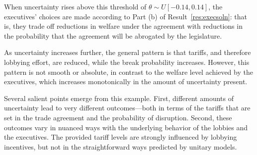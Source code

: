 \documentclass[10pt]{article}
\newcommand{\ve}{\theta}
\begin{document}

When uncertainty rises above this threshold of $\ve \sim U[-0.14,0.14]$, the executives' choices are made according to Part (b) of Result~\ref{res:execsoln}: that is, they trade off reductions in welfare under the agreement with reductions in the probability that the agreement will be abrogated by the legislature. %

As uncertainty increases further, the general pattern is that tariffs, and therefore lobbying effort, are reduced, while the break probability increases. However, this pattern is not smooth or absolute, in contrast to the welfare level achieved by the executives, which increases monotonically in the amount of uncertainty present. %

Several salient points emerge from this example. First, different amounts of uncertainty lead to very different outcomes---both in terms of the tariffs that are set in the trade agreement and the probability of disruption. Second, these outcomes vary in nuanced ways with the underlying behavior of the lobbies and the executives. The provided tariff levels are strongly influenced by lobbying incentives, but not in the straightforward ways predicted by unitary models.
\end{document}
